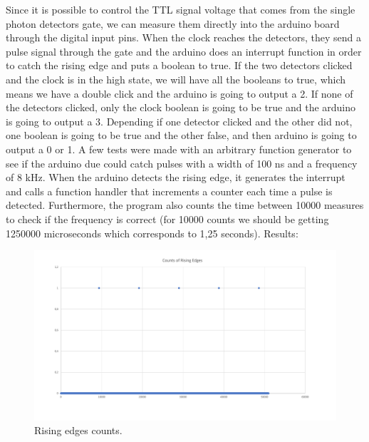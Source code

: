 \begin{refsection}
Since it is possible to control the TTL signal voltage that comes from the single photon detectors gate, we can measure them directly into the arduino board through the digital input pins. When the clock reaches the detectors, they send a pulse signal through the gate and the arduino does an interrupt function in order to catch the rising edge and puts a boolean to true. If the two detectors clicked and the clock is in the high state, we will have all the booleans to true, which means we have a double click and the arduino is going to output a 2. If none of the detectors clicked, only the clock boolean is going to be true and the arduino is going to output a 3. Depending if one detector clicked and the other did not, one boolean is going to be true and the other false, and then arduino is going to output a 0 or 1.
A few tests were made with an arbitrary function generator to see if the arduino due could catch pulses with a width of 100 ns and a frequency of 8 kHz. When the arduino detects the rising edge, it generates the interrupt and calls a function handler that increments a counter each time a pulse is detected. Furthermore, the program also counts the time between 10000 measures to check if the frequency is correct (for 10000 counts we should be getting 1250000 microseconds which corresponds to 1,25 seconds). 
\clearpage
Results:
\begin{figure}[H]
	\centering
	\includegraphics[width=1\linewidth]{./sdf/arduino_quantum_rx/figures/Teste2.pdf}
	\caption{Rising edges counts.}
	\label{montage}
\end{figure}


\end{refsection}
